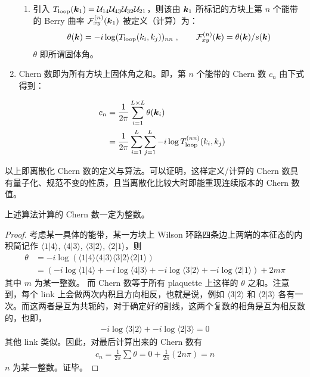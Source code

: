\begin{enumerate}
\begin{enumerate}
\item 引入 $T_{\text{loop}}(\boldsymbol{k}_1) = \mathcal{U}_{14}\mathcal{U}_{43}\mathcal{U}_{32}\mathcal{U}_{21}$，则该由 $\boldsymbol{k}_1$ 所标记的方块上第 $n$ 个能带的 Berry 曲率 $\mathcal{F}_{xy}^{(n)}(\boldsymbol{k}_1)$ 被定义（计算）为：
\begin{align}
\theta(\boldsymbol{k}) = -i \log(T_{\text{loop}}(k_i, k_j))_{nn}\; ,
\qquad    
\mathcal{F}_{xy}^{(n)}(\boldsymbol{k}) = \theta(\boldsymbol{k}) / s(\boldsymbol{k})
\end{align}
$\theta$ 即所谓固体角。

\end{enumerate}

\item Chern 数即为所有方块上固体角之和。即，第 $n$ 个能带的 Chern 数 $c_n$ 由下式得到：

\begin{align}
c_n &= \frac{1}{2\pi} \sum_{i=1}^{L\times L} \theta(\boldsymbol{k}_i) \notag \\ 
&= \frac{1}{2\pi}\sum_{i=1}^{L}\sum_{j=1}^{L} -i \log T_{\text{loop}}^{(nn)}(k_i, k_j)
\end{align}

\end{enumerate}

以上即离散化 Chern 数的定义与算法。可以证明，这样定义/计算的 Chern 数具有量子化、规范不变的性质，且当离散化比较大时即能重现连续版本的 Chern 数值。




\begin{theorem}
上述算法计算的 Chern 数一定为整数。
\end{theorem}

\begin{proof}
考虑某一具体的能带，某一方块上 Wilson 环路四条边上两端的本征态的内积简记作 $\langle1|4\rangle$, $\langle4|3\rangle$, $\langle3|2\rangle$, $\langle2|1\rangle$，则
\begin{align}
\theta &= -i\log (\langle1|4\rangle\langle4|3\rangle\langle3|2\rangle\langle2|1\rangle) \\ 
&= (-i\log \langle1|4\rangle + -i\log \langle4|3\rangle + -i\log \langle3|2\rangle + -i\log \langle2|1\rangle) + 2m\pi
\end{align}
其中 $m$ 为某一整数。
而 Chern 数等于所有 plaquette 上这样的 $\theta$ 之和。注意到，每个 link 上会做两次内积且方向相反，也就是说，例如 $\langle3|2\rangle$ 和 $\langle2|3\rangle$ 各有一次。而这两者是互为共轭的，对于确定好的割线，这两个复数的相角是互为相反数的，也即，
\begin{align}
-i\log \langle3|2\rangle + -i\log\langle2|3\rangle = 0
\end{align}
其他 link 类似。因此，对最后计算出来的 Chern 数有
\begin{align}
c_n = \frac{1}{2\pi}\sum \theta = 0 + \frac{1}{2\pi}(2n\pi) = n
\end{align}
$n$ 为某一整数。证毕。
\end{proof}


